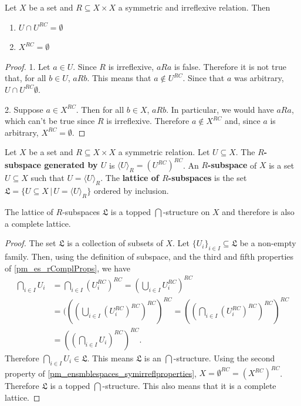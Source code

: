 \begin{prop}\label{pm_ensmblespaces_symirreflproperties}
	Let $X$ be a set and $R \subseteq X \times X$ a symmetric and irreflexive relation. Then
	\begin{enumerate}
		\item $U \cap U^{RC} = \emptyset$
		\item $X^{RC} = \emptyset$
	\end{enumerate}
\end{prop}

\begin{proof}
	1. Let $a \in U$. Since $R$ is irreflexive,  $aRa$ is false. Therefore it is not true that, for all $b \in U$, $aRb$. This means that $a \notin U^{RC}$. Since that $a$ was arbitrary, $U \cap U^{RC} \emptyset$.
	
	2. Suppose $a \in X^{RC}$. Then for all $b \in X$, $aRb$. In particular, we would have $aRa$, which can't be true since $R$ is irreflexive. Therefore $a \notin X^{RC}$ and, since $a$ is arbitrary, $X^{RC} = \emptyset$.
\end{proof}

\begin{defn}
	Let $X$ be a set and $R \subseteq X \times X$ a symmetric relation. Let $U \subseteq X$. The \textbf{$R$-subspace generated by $U$} is $\langle U \rangle_R = (U^{RC})^{RC}$. An \textbf{$R$-subspace} of $X$ is a set $U \subseteq X$ such that $U = \langle U \rangle_R$. The \textbf{lattice of $R$-subspaces} is the set $\mathfrak{L} = \{ U \subseteq X \, | \, U = \langle U \rangle_R \}$ ordered by inclusion.
\end{defn}

\begin{coro}
	The lattice of $R$-subspaces $\mathfrak{L}$ is a topped $\bigcap$-structure on $X$ and therefore is also a complete lattice.
\end{coro}
\begin{proof}
	The set $\mathfrak{L}$ is a collection of subsets of $X$. Let $\{U_i\}_{i \in I} \subseteq \mathfrak{L}$ be a non-empty family. Then, using the definition of subspace, and the third and fifth properties of \ref{pm_es_rComplProps}, we have
	\begin{align*}
		\bigcap_{i \in I} U_i &= \bigcap_{i \in I} (U_i^{RC})^{RC} = (\bigcup_{i \in I} U_i^{RC})^{RC} \\
		&= (((\bigcup_{i \in I} (U_i^{RC})^{RC})^{RC})^{RC} = ((\bigcap_{i \in I} (U_i^{RC})^{RC})^{RC})^{RC} \\
		&= ((\bigcap_{i \in I} U_i)^{RC})^{RC}.
	\end{align*}
	Therefore $\bigcap_{i \in I} U_i \in \mathfrak{L}$. This means $\mathfrak{L}$ is an $\bigcap$-structure. Using the second property of \ref{pm_ensmblespaces_symirreflproperties}, $X = \emptyset^{RC} = (X^{RC})^{RC}$. Therefore $\mathfrak{L}$ is a topped $\bigcap$-structure. This also means that it is a complete lattice.
\end{proof}


